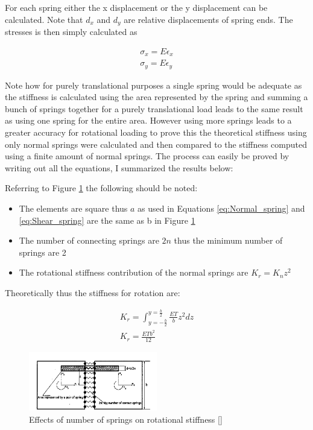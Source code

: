 For each spring either the x displacement or the y displacement can be calculated.  Note that $d_x$ and $d_y$ are relative displacements of spring ends.  The stresses is then simply calculated as

\begin{eqnarray}
\sigma_x = E \epsilon_x \label{eq:stress_x} \\
\sigma_y = E \epsilon_y \label{eq:stress_y}
\end{eqnarray}


Note how for purely translational purposes a single spring would be adequate as the stiffness is calculated using the area represented by the spring and summing a bunch of springs together for a purely translational load leads to the same result as using one spring for the entire area.  However using more springs leads to a greater accuracy for rotational loading to prove this the theoretical stiffness using only normal springs were calculated and then compared to the stiffness computed using a finite amount of normal springs. 
The process can easily be proved by writing out all the equations, I summarized the results below:

Referring to Figure \ref{fig:rotational_accuracy_AEM} the following should be noted:
\begin{itemize}
	\item The elements are square thus $a$ as used in Equations \ref{eq:Normal_spring} and \ref{eq:Shear_spring} are the same as b in Figure \ref{fig:rotational_accuracy_AEM}
	\item The number of connecting springs are $2n$ thus the minimum number of springs are 2
	\item The rotational stiffness contribution of the normal springs are $K_r = K_n z^2$
\end{itemize}

Theoretically thus the stiffness for rotation are:

\begin{eqnarray}
K_r = \int_{y = -\frac{b}{2}}^{y = \frac{b}{2}} \frac{ET}{b} z^2 dz \\
K_r = \frac{ETb^2}{12} 
\label{eq:infinite_rot_stiff}
\end{eqnarray}

\begin{figure}[H]
\centering
\includegraphics[width=0.5\textwidth]{../rotational_accuracy_AEM.png}
\caption{Effects of number of springs on rotational stiffness [\cite{First_AEM}]}
\label{fig:rotational_accuracy_AEM}
\end{figure}

